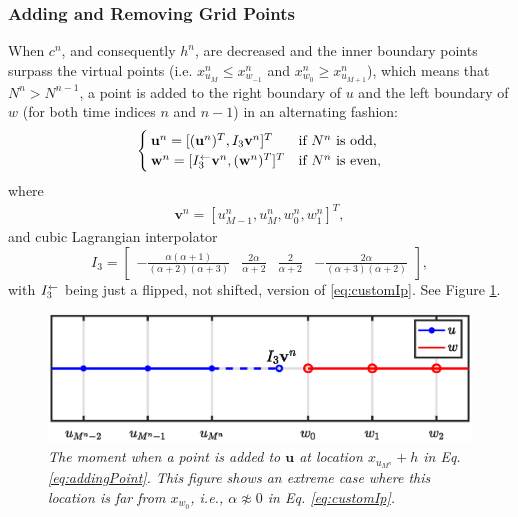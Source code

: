 \subsubsection{Adding and Removing Grid Points}\label{sec:addRemove}
When $c^n$, and consequently $h^n$, are decreased and the inner boundary points surpass the virtual points (i.e. $x_{u_M}^n \leq x_{w_{-1}}^n$ and $x_{w_0}^n \geq x_{u_{M+1}}^n$), which means that $N^n >  N^{n-1}$, a point is added to the right boundary of $u$ and the left boundary of $w$ (for both time indices $n$ and $n-1$) in an alternating fashion: 
\begin{equation}\label{eq:addingPoint}
        \begin{cases}\mathbf{u}^n = [(\mathbf{u}^n)^T, I_3\mathbf{v}^n]^T & \text{if $N^n $ is odd},\\
        \mathbf{w}^n = [I_3^\leftarrow\mathbf{v}^n, (\mathbf{w}^n)^T]^T & \text{if $ N^n$ is even},
        \end{cases}
\end{equation}
where 
\begin{align*}
\mathbf{v}^n = [u_{M-1}^n, u_M^n, w_0^n, w_1^n]^T,%
\end{align*}
and cubic Lagrangian interpolator
\begin{equation}\label{eq:customIp}
    I_3 = \begin{bmatrix} -\frac{\alpha(\alpha+1)}{(\alpha+2)(\alpha+3)} &\frac{2\alpha}{\alpha+2} &\frac{2}{\alpha+2} 
    &-\frac{2\alpha}{(\alpha+3)(\alpha+2)}
    \end{bmatrix},
\end{equation}
with $I_3^\leftarrow$ being just a flipped, not shifted, version of \eqref{eq:customIp}.
See Figure \ref{fig:addingPoint}.
%
\begin{figure}[t]
    \centering
\includegraphics[width=\figwidth\columnwidth]{Figures/addingGridPointNarrow.eps}
\caption{\label{fig:addingPoint}{\it The moment when a point is added to $\mathbf{u}$ at location $x_{u_{M^n}} + h$ in Eq. \eqref{eq:addingPoint}. This figure shows an extreme case where this location is far from $x_{w_0}$, i.e., $\alpha \not\approx 0$ in Eq. \eqref{eq:customIp}.}}
\end{figure}
